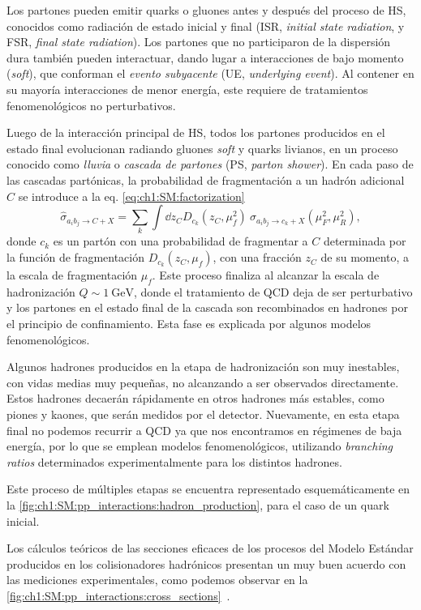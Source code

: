 Los partones pueden emitir quarks o gluones antes y después del proceso de HS, conocidos como radiación de estado inicial y final (ISR, \textit{initial state radiation}, y FSR, \textit{final state radiation}). Los partones que no participaron de la dispersión dura también pueden interactuar, dando lugar a interacciones de bajo momento (\textit{soft}), que conforman el \textit{evento subyacente} (UE, \textit{underlying event}). Al contener en su mayoría interacciones de menor energía, este requiere de tratamientos fenomenológicos no perturbativos.

Luego de la interacción principal de HS, todos los partones producidos en el estado final evolucionan radiando gluones \textit{soft} y quarks livianos, en un proceso conocido como \textit{lluvia} o \textit{cascada de partones} (PS, \textit{parton shower}). En cada paso de las cascadas partónicas, la probabilidad de fragmentación a un hadrón adicional $C$ se introduce a la eq. \eqref{eq:ch1:SM:factorization}
\[ \hat{\sigma}_{a_i b_j \to C + X} =  \sum_k \int \dd{z_C} D_{c_k}(z_C,\mu_f^2) \ \sigma_{a_i b_j \to c_k + X}(\mu_F^2, \mu_R^2), \]
donde $c_k$ es un partón con una probabilidad de fragmentar a $C$ determinada por la función de fragmentación $D_{c_k}(z_C, \mu_f)$, con una fracción $z_C$ de su momento, a la escala de fragmentación $\mu_f$. Este proceso finaliza al alcanzar la escala de hadronización $Q \sim \SI{1}{\GeV}$, donde el tratamiento de QCD deja de ser perturbativo y los partones en el estado final de la cascada son recombinados en hadrones por el principio de confinamiento. Esta fase es explicada por algunos modelos fenomenológicos.

Algunos hadrones producidos en la etapa de hadronización son muy inestables, con vidas medias muy pequeñas, no alcanzando a ser observados directamente. Estos hadrones decaerán rápidamente en otros hadrones más estables, como piones y kaones, que serán medidos por el detector. Nuevamente, en esta etapa final no podemos recurrir a QCD ya que nos encontramos en régimenes de baja energía, por lo que se emplean modelos fenomenológicos, utilizando \textit{branching ratios} determinados experimentalmente para los distintos hadrones.

Este proceso de múltiples etapas se encuentra representado esquemáticamente en la \cref{fig:ch1:SM:pp_interactions:hadron_production}, para el caso de un quark inicial.

Los cálculos teóricos de las secciones eficaces de los procesos del Modelo Estándar producidos en los colisionadores hadrónicos presentan un muy buen acuerdo con las mediciones experimentales, como podemos observar en la \cref{fig:ch1:SM:pp_interactions:cross_sections}~\cite{ATL-PHYS-PUB-2021-032}.

